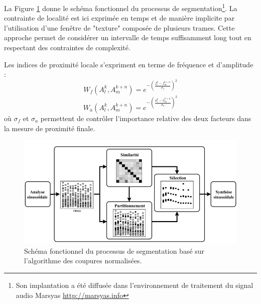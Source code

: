 La Figure \ref{fig:ncut} donne le schéma fonctionnel du processus de segmentation\footnote{Son implantation a été diffusée dans l'environnement de traitement du signal audio Marsyas \url{http://marsyas.info}}. La contrainte de localité est ici exprimée en temps et de manière implicite par l'utilisation d'une fenêtre de "texture" composée de plusieurs trames. Cette approche permet de considérer un intervalle de temps suffisamment long tout en respectant des contraintes de complexité.

Les indices de proximité locale s'expriment en terme de fréquence et d'amplitude :
\begin{equation}
  W_f \left( A _ { l } ^ { k } , A _ { m } ^ { k + n } \right) = e ^ { - \left( \frac { f _ { l } ^ { k } - f _ { m } ^ { k + n } } { \sigma _ { f } } \right) ^ { 2 } }
\end{equation}
\begin{equation}
  W_a \left( A _ { l } ^ { k } , A _ { m } ^ { k + n } \right) =  e ^{ - \left( \frac { a _ { l } ^ { k } - a _ { m } ^ { k + n } } { \sigma _ { a } } \right) ^ { 2 } }
\end{equation}
où $\sigma _ { f }$ et $\sigma _ { a }$ permettent de contrôler l'importance relative des deux facteurs dans la mesure de proximité finale.

\begin{figure}[t]
  \includegraphics[width=1\textwidth]{figures/ncutDiagramFr.png}
  \caption{Schéma fonctionnel du processus de segmentation basé sur l'algorithme des coupures normalisées.}  \label{fig:ncut}
\end{figure}

